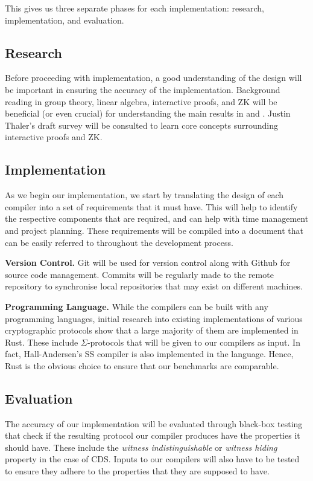 This gives us three separate phases for each implementation: research, implementation, and evaluation.

\subsection{Research}
Before proceeding with implementation, a good understanding of the design will be important in ensuring the accuracy of the implementation. Background reading in group theory, linear algebra, interactive proofs, and ZK will be beneficial (or even crucial) for understanding the main results in \cite{CDS94} and \cite{StackingSigmas}. Justin Thaler's draft survey \cite{PAZK} will be consulted to learn core concepts surrounding interactive proofs and ZK. 

\subsection{Implementation}
As we begin our implementation, we start by translating the design of each compiler into a set of requirements that it must have. This will help to identify the respective components that are required, and can help with time management and project planning. These requirements will be compiled into a document that can be easily referred to throughout the development process. 

\textbf{Version Control.} Git will be used for version control along with Github for source code management. Commits will be regularly made to the remote repository to synchronise local repositories that may exist on different machines. 

\textbf{Programming Language.} While the compilers can be built with any programming languages, initial research into existing implementations of various cryptographic protocols show that a large majority of them are implemented in Rust. These include $\Sigma$-protocols that will be given to our compilers as input. In fact, Hall-Andersen's SS compiler is also implemented in the language. Hence, Rust is the obvious choice to ensure that our benchmarks are comparable. 

\subsection{Evaluation}
The accuracy of our implementation will be evaluated through black-box testing that check if the resulting protocol our compiler produces have the properties it should have. These include the \textit{witness indistinguishable} or \textit{witness hiding} property in the case of CDS. Inputs to our compilers will also have to be tested to ensure they adhere to the properties that they are supposed to have. 

